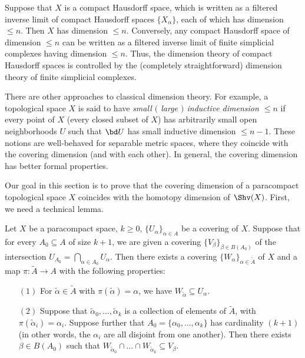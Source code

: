 \begin{remark}
Suppose that $X$ is a compact Hausdorff space, which is written as
a filtered inverse limit of compact Hausdorff spaces $\{
X_{\alpha} \}$, each of which has dimension $\leq n$. Then $X$ has
dimension $\leq n$. Conversely, any compact Hausdorff space of
dimension $\leq n$ can be written as a filtered inverse limit of
finite simplicial complexes having dimension $\leq n$. Thus, the
dimension theory of compact Hausdorff spaces is controlled by the
(completely straightforward) dimension theory of finite simplicial
complexes.
\end{remark}

\begin{remark}
There are other approaches to classical dimension theory. For
example, a topological space $X$ is said to have {\it small
$($ large $)$ inductive dimension $\leq n$} if every point of $X$ (every
closed subset of $X$) has arbitrarily small open neighborhoods $U$
such that $\bd U$ has small inductive dimension $\leq n-1$. These
notions are well-behaved for separable metric spaces, where they
coincide with the covering dimension (and with each other). In
general, the covering dimension has better formal properties.
\end{remark}

Our goal in this section is to prove that the covering dimension of a paracompact topological space $X$ coincides with the homotopy dimension of $\Shv(X)$.
First, we need a technical
lemma.

\begin{lemma}\label{core}
Let $X$ be a paracompact space, $k \geq 0$, $\{U_{\alpha}
\}_{\alpha \in A}$ be a covering of $X$. Suppose that for every
$A_0 \subseteq A$ of size $k+1$, we are given a covering
$\{V_{\beta} \}_{\beta \in B(A_0)}$ of the intersection $U_{A_0} =
\bigcap_{\alpha \in A_0} U_{\alpha}$. Then there exists a covering
$\{ W_{\alpha} \}_{\alpha \in \widetilde{A}}$ of $X$ and a map
$\pi: \widetilde{A} \rightarrow A$ with the following properties:
\begin{itemize}
\item[$(1)$] For $\widetilde{\alpha} \in \widetilde{A}$ with $\pi(\widetilde{\alpha}) = \alpha$, we have $W_{\widetilde{\alpha}} \subseteq U_{\alpha}$. 

\item[$(2)$] Suppose that $\widetilde{\alpha}_0, \ldots, \widetilde{\alpha}_k$ is a collection
of elements of $\widetilde{A}$, with $\pi( \widetilde{\alpha}_i ) = \alpha_i$. Suppose
further that $A_0 = \{ \alpha_0, \ldots, \alpha_k \}$ has cardinality $(k+1)$ (in other words, the $\alpha_i$ are all disjoint from one another). 
Then there exists
$\beta \in B(A_0)$ such that $W_{\widetilde{\alpha}_0} \cap \ldots \cap
W_{\widetilde{\alpha}_k} \subseteq V_{\beta}$.
\end{itemize}
\end{lemma}

